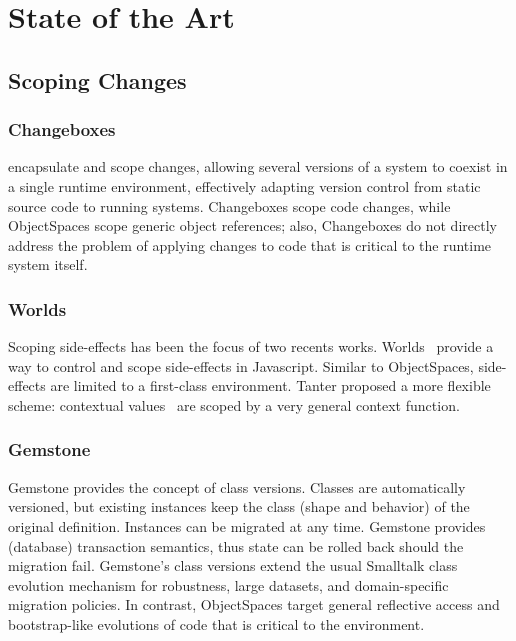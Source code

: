 
\chapter{State of the Art}
\minitoc
\introduction
	
	
\newpage
\section{Scoping Changes}

\subsection*{Changeboxes} \cite{Denk07c} encapsulate and scope changes, allowing several versions of a system to coexist in a single runtime environment, effectively adapting version control from static source code to running systems. Changeboxes scope code changes, while ObjectSpaces scope generic object references; also, Changeboxes do not directly address the problem of applying changes to code that is critical to the runtime system itself.

\subsection*{Worlds}Scoping side-effects has been the focus of two recents works. Worlds~\cite{Wart08a} provide a way to control and scope side-effects in Javascript. Similar to
ObjectSpaces, side-effects are limited to a first-class environment.  Tanter proposed a more flexible scheme: contextual values~\cite{Tant08b} are scoped 
by a very general context function.

\subsection*{Gemstone}Gemstone \cite{Otis91a} provides the concept of class versions. Classes are
automatically versioned, but existing instances keep the class (shape and
behavior) of the original definition. Instances can be migrated at any time.
Gemstone provides (database) transaction semantics, thus state can be rolled
back should the migration fail.
Gemstone's class versions extend the usual Smalltalk class evolution mechanism for robustness, 
large datasets, and domain-specific migration policies. In contrast, ObjectSpaces target general 
reflective access and bootstrap-like evolutions of code that is critical to the environment.


